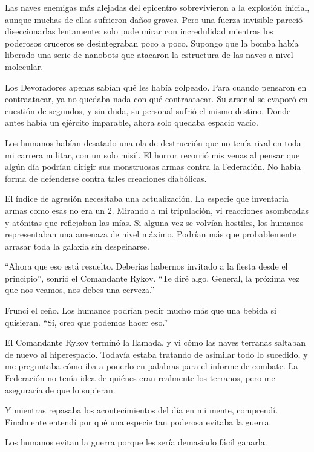 \documentclass[spanish,12pt,a4paper,oneside,titlepage]{book}
\begin{document}
    Las naves enemigas más alejadas del epicentro sobrevivieron a la explosión inicial, aunque muchas de ellas sufrieron daños graves. Pero una fuerza invisible pareció diseccionarlas lentamente; solo pude mirar con incredulidad mientras los poderosos cruceros se desintegraban poco a poco. Supongo que la bomba había liberado una serie de nanobots que atacaron la estructura de las naves a nivel molecular.

    Los Devoradores apenas sabían qué les había golpeado. Para cuando pensaron en contraatacar, ya no quedaba nada con qué contraatacar. Su arsenal se evaporó en cuestión de segundos, y sin duda, su personal sufrió el mismo destino. Donde antes había un ejército imparable, ahora solo quedaba espacio vacío.

    Los humanos habían desatado una ola de destrucción que no tenía rival en toda mi carrera militar, con un solo misil. El horror recorrió mis venas al pensar que algún día podrían dirigir sus monstruosas armas contra la Federación. No había forma de defenderse contra tales creaciones diabólicas.

    El índice de agresión necesitaba una actualización. La especie que inventaría armas como esas no era un 2. Mirando a mi tripulación, vi reacciones asombradas y atónitas que reflejaban las mías. Si alguna vez se volvían hostiles, los humanos representaban una amenaza de nivel máximo. Podrían más que probablemente arrasar toda la galaxia sin despeinarse.

    ``Ahora que eso está resuelto. Deberías habernos invitado a la fiesta desde el principio'', sonrió el Comandante Rykov. ``Te diré algo, General, la próxima vez que nos veamos, nos debes una cerveza.''

    Fruncí el ceño. Los humanos podrían pedir mucho más que una bebida si quisieran. ``Sí, creo que podemos hacer eso.''

    El Comandante Rykov terminó la llamada, y vi cómo las naves terranas saltaban de nuevo al hiperespacio. Todavía estaba tratando de asimilar todo lo sucedido, y me preguntaba cómo iba a ponerlo en palabras para el informe de combate. La Federación no tenía idea de quiénes eran realmente los terranos, pero me aseguraría de que lo supieran.

    Y mientras repasaba los acontecimientos del día en mi mente, comprendí. Finalmente entendí por qué una especie tan poderosa evitaba la guerra.

    Los humanos evitan la guerra porque les sería demasiado fácil ganarla.
\end{document}

